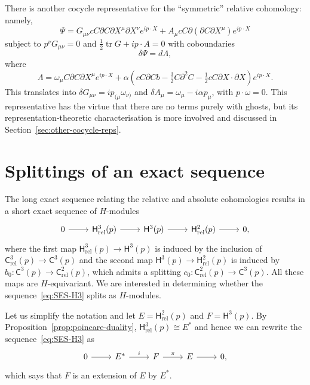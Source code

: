 \documentclass[11pt,reqno,a4paper,final]{amsart}
\theoremstyle{plain}
\theoremstyle{definition}
\renewcommand{\d}{\partial}
\newcommand{\sC}{\mathsf{C}}
\newcommand{\sH}{\mathsf{H}}
\newcommand{\Crel}{\mathsf{C}_{\mathrm{rel}}} %
\newcommand{\Hrel}{\mathsf{H}_{\mathrm{rel}}}
\newcommand{\tr}{\operatorname{tr}}
\newcommand{\1}{\mathbb{1}}
\numberwithin{equation}{section}
\begin{document}
\begin{appendices}
There is another cocycle representative for the ``symmetric'' relative
cohomology: namely,
\begin{equation}\label{eq:Zrel3-alt-symm-vertex-op}
  \Psi = G_{\mu\nu} c C \d C \d X^\mu \d X^\nu e^{i p \cdot X} + A_\mu c C  \d (\d C \d X^\mu) e^{i p\cdot X}
\end{equation}
subject to $p^\nu G_{\mu\nu} = 0$ and $\tfrac12 \tr G + i p \cdot A =
0$ with coboundaries
\begin{equation}
  \delta \Psi = d \Lambda,
\end{equation}
where
\begin{equation}
  \Lambda = \omega_\mu C \d C \d X^\mu e^{i p \cdot X} + \alpha \left( c C \d C b - \tfrac32 C \d^2 C - \tfrac12 c C \d X \cdot \d X  \right) e^{i p \cdot X}.
\end{equation}
This translates into $\delta G_{\mu\nu} = i p_{(\mu} \omega_{\nu)}$
and $\delta A_\mu = \omega_\mu - i \alpha p_\mu$, with $p\cdot \omega
= 0$.  This representative has the virtue that there are no terms
purely with ghosts, but its representation-theoretic characterisation
is more involved and discussed in
Section~\ref{sec:other-cocycle-reps}.

\section{Splittings of an exact sequence}
\label{app:splitting}

The long exact sequence relating the relative and absolute
cohomologies results in a short exact sequence of $H$-modules
\begin{equation}
  \label{eq:SES-H3}
  \begin{tikzcd}
    0 \arrow[r] & \Hrel^3(p) \arrow[r] & \sH^3(p) \arrow[r] & \Hrel^2(p) \arrow[r] & 0,
  \end{tikzcd}
\end{equation}
where the first map $\Hrel^3(p) \to \sH^3(p)$ is induced by the
inclusion of $\Crel^3(p) \to \sC^3(p)$ and the second map $\sH^3(p)
\to \Hrel^2(p)$ is induced by $b_0 \colon \sC^3(p) \to \Crel^2(p)$,
which admits a splitting $c_0 \colon \Crel^2(p) \to \sC^3(p)$.  All
these maps are $H$-equivariant.  We are interested in determining
whether the sequence~\eqref{eq:SES-H3} splits as $H$-modules.

Let us simplify the notation and let $E = \Hrel^2(p)$ and
$F = \sH^3(p)$.  By Proposition~\ref{prop:poincare-duality},
$\Hrel^3(p) \cong E^*$ and hence we can rewrite the
sequence~\eqref{eq:SES-H3} as
\begin{equation}
  \label{eq:SES-H-mods}
  \begin{tikzcd}
    0 \arrow[r] & E^* \arrow[r,"i"] & F  \arrow[r,"\pi"] & E \arrow[r] & 0,
  \end{tikzcd}
\end{equation}
which says that $F$ is an extension of $E$ by $E^*$.


\end{appendices}
\end{document}
